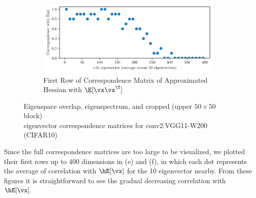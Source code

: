 \begin{figure}[H]
\begin{subfigure}[b]{0.49\textwidth}
        \label{fig:app_adexp_vgg2_corr_true_firstline}
    \end{subfigure}
    \begin{subfigure}[b]{0.49\textwidth}
        \centering
        \captionsetup{justification=centering}
        \includegraphics[width=\textwidth]{Appendix_Figures/Overlap_large_model/FailExplanation/VGGlate/FL_xxT_Approxest_real_corr_expand_t400_CIFAR10_Exp1_VGG11W200_fxlr0.01_E-1_features.3.pdf}
        \caption{First Row of Correspondence Matrix of Approximated Hessian with $\E[\vx\vx^\T]$}
        \label{fig:app_adexp_vgg2_corr_est_firstline}
    \end{subfigure}
    \captionsetup{justification=centering}
    \caption{Eigenspace overlap, eigenspectrum, and cropped (upper $50\times 50$ block)\\eigenvector correspondence matrices for conv2:VGG11-W200 (CIFAR10)}
    \vspace{-0.1in}
    \label{fig:app_adexp_vgg2}
\end{figure}

Since the full correspondence matrices are too large to be visualized, we plotted their first rows up to 400 dimensions in (e) and (f), in which each dot represents the average of correlation with $\hE[\vx]$ for the 10 eigenvector nearby. From these figures it is straightforward to see the gradual decreasing correlation with $\hE[\vx].$

